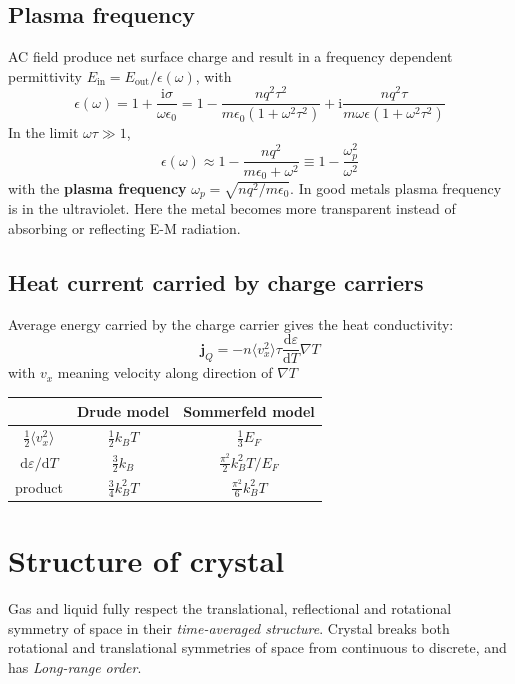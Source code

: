 \documentclass[11pt,letterpaper]{article}
\numberwithin{equation}{section} %
\renewcommand*{\vec}[1]{\bm{#1}}
\newcommand{\dif}{\mathrm d}
\newcommand\mi{\mathrm{i}}
\begin{document}
\subsection{Plasma frequency}
\label{sub:plasma_frequency}
AC field produce net surface charge and result in a frequency dependent
permittivity $E_{\mbox{in}} = E_{\mbox{out}}/\epsilon(\omega)$, with
\begin{equation}
	\epsilon(\omega) = 1 + \frac{\mi\sigma}{\omega\epsilon_0} 
	= 1 - \frac{nq^2\tau^2}{m\epsilon_0(1+\omega^2\tau^2)} +
	\mi\frac{nq^2\tau}{m\omega\epsilon(1+\omega^2\tau^2)}
\end{equation}
In the limit $\omega\tau \gg 1$, 
\begin{equation}
	\epsilon(\omega) \approx 1- \frac{nq^2}{m\epsilon_0+\omega^2} 
	\equiv 1- \frac{\omega_p^2}{\omega^2}
\end{equation}
with the \textbf{plasma frequency} $\omega_p = \sqrt{nq^2/m\epsilon_0}$. 
In good metals plasma frequency is in the ultraviolet. Here the metal becomes
more transparent instead of absorbing or reflecting E-M radiation.

\subsection{Heat current carried by charge carriers}
\label{sub:heat_current_carried_by_charge_carriers}
Average energy carried by the charge carrier gives the heat conductivity: 
\begin{equation}
	\vec j_Q = -n\langle v_x^2\rangle \tau \frac{\dif\varepsilon}{\dif T}\nabla T
\end{equation}
with $v_x$ meaning velocity along direction of $\nabla T$
\begin{center}
\begin{tabular}{c|cc}
                              & Drude model        & Sommerfeld model \\\hline
$\frac12\langle v_x^2\rangle$ & $\frac 12 k_BT$    & $\frac 13 E_F$ \\
$\dif\varepsilon/\dif T$      & $\frac 32 k_B$     & $\frac{\pi^2}2k_B^2T/E_F$ \\
product                       & $\frac 34 k_B^2 T$ &
$\frac{\pi^2}{6}k_B^2T$\\\hline
\end{tabular}
\end{center}

\section{Structure of crystal}
\label{sec:structure_of_crystal}
Gas and liquid fully respect the translational, reflectional and rotational
symmetry of space in their \emph{time-averaged structure}. Crystal breaks
both rotational and translational symmetries of space from continuous to
discrete, and has \emph{Long-range order}. 
\end{document}
